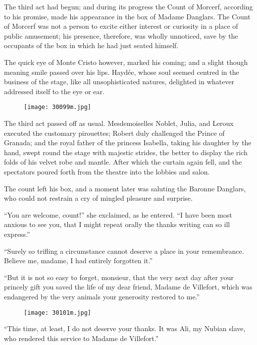 The third act had begun; and during its progress the Count of Morcerf,
according to his promise, made his appearance in the box of Madame
Danglars. The Count of Morcerf was not a person to excite either
interest or curiosity in a place of public amusement; his presence,
therefore, was wholly unnoticed, save by the occupants of the box in
which he had just seated himself.

The quick eye of Monte Cristo however, marked his coming; and a slight
though meaning smile passed over his lips. Haydée, whose soul seemed
centred in the business of the stage, like all unsophisticated natures,
delighted in whatever addressed itself to the eye or ear.

\begin{figure}[ht]
\texttt{[image: 30099m.jpg]}
\end{figure}

The third act passed off as usual. Mesdemoiselles Noblet, Julia, and
Leroux executed the customary pirouettes; Robert duly challenged the
Prince of Granada; and the royal father of the princess Isabella,
taking his daughter by the hand, swept round the stage with majestic
strides, the better to display the rich folds of his velvet robe and
mantle. After which the curtain again fell, and the spectators poured
forth from the theatre into the lobbies and salon.

The count left his box, and a moment later was saluting the Baronne
Danglars, who could not restrain a cry of mingled pleasure and
surprise.

“You are welcome, count!” she exclaimed, as he entered. “I have been
most anxious to see you, that I might repeat orally the thanks writing
can so ill express.”

“Surely so trifling a circumstance cannot deserve a place in your
remembrance. Believe me, madame, I had entirely forgotten it.”

“But it is not so easy to forget, monsieur, that the very next day
after your princely gift you saved the life of my dear friend, Madame
de Villefort, which was endangered by the very animals your generosity
restored to me.”

\begin{figure}[ht]
\texttt{[image: 30101m.jpg]}
\end{figure}

“This time, at least, I do not deserve your thanks. It was Ali, my
Nubian slave, who rendered this service to Madame de Villefort.”

